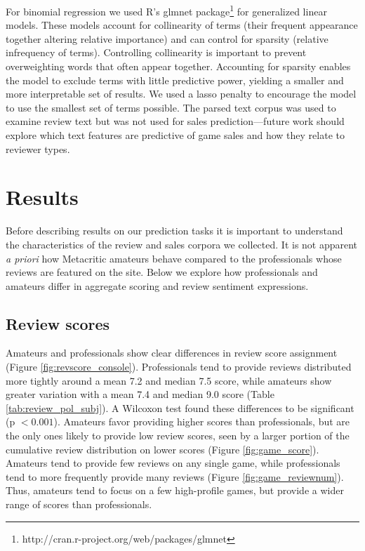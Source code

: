 \documentclass{sig-alternate}
\begin{document}
For binomial regression we used R's glmnet package\footnote{http://cran.r-project.org/web/packages/glmnet} for generalized linear models. These models account for collinearity of terms (their frequent appearance together altering relative importance) and can control for sparsity (relative infrequency of terms). Controlling collinearity is important to prevent overweighting words that often appear together. Accounting for sparsity enables the model to exclude terms with little predictive power, yielding a smaller and more interpretable set of results. We used a lasso penalty to encourage the model to use the smallest set of terms possible. The parsed text corpus was used to examine review text but was not used for sales prediction---future work should explore which text features are predictive of game sales and how they relate to reviewer types.


\pagebreak

\section{Results}
Before describing results on our prediction tasks it is important to understand the characteristics of the review and sales corpora we collected. It is not apparent \textit{a priori} how Metacritic amateurs behave compared to the professionals whose reviews are featured on the site. Below we explore how professionals and amateurs differ in aggregate scoring and review sentiment expressions.

\subsection{Review scores}
Amateurs and professionals show clear differences in review score assignment (Figure \ref{fig:revscore_console}). Professionals tend to provide reviews distributed more tightly around a mean 7.2 and median 7.5 score, while amateurs show greater variation with a mean 7.4 and median 9.0 score (Table \ref{tab:review_pol_subj}). A Wilcoxon test found these differences to be significant (p $< 0.001$). Amateurs favor providing higher scores than professionals, but are the only ones likely to provide low review scores, seen by a larger portion of the cumulative review distribution on lower scores (Figure \ref{fig:game_score}). Amateurs tend to provide few reviews on any single game, while professionals tend to more frequently provide many reviews (Figure \ref{fig:game_reviewnum}). Thus, amateurs tend to focus on a few high-profile games, but provide a wider range of scores than professionals. 
\end{document}
